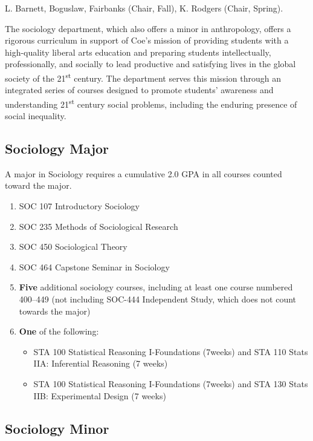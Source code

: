 \documentclass[
  letterpaper,
]{scrbook}
\providecommand{\tightlist}{%
  \setlength{\itemsep}{0pt}\setlength{\parskip}{0pt}}
\begin{document}
L. Barnett, Boguslaw, Fairbanks (Chair, Fall), K. Rodgers (Chair,
Spring).

The sociology department, which also offers a minor in anthropology,
offers a rigorous curriculum in support of Coe's mission of providing
students with a high-quality liberal arts education and preparing
students intellectually, professionally, and socially to lead productive
and satisfying lives in the global society of the 21\textsuperscript{st}
century. The department serves this mission through an integrated series
of courses designed to promote students' awareness and understanding
21\textsuperscript{st} century social problems, including the enduring
presence of social inequality.

\subsection{Sociology Major}\label{sociology-major}

A major in Sociology requires a cumulative 2.0 GPA in all courses
counted toward the major.

\begin{enumerate}
\def\labelenumi{\arabic{enumi}.}
\item
  SOC 107 Introductory Sociology
\item
  SOC 235 Methods of Sociological Research
\item
  SOC 450 Sociological Theory
\item
  SOC 464 Capstone Seminar in Sociology
\item
  \textbf{Five} additional sociology courses, including at least one
  course numbered 400--449 (not including SOC-444 Independent Study,
  which does not count towards the major)
\item
  \textbf{One} of the following:

  \begin{itemize}
  \tightlist
  \item
    STA 100 Statistical Reasoning I-Foundations (7weeks) and STA 110
    Stats IIA: Inferential Reasoning (7 weeks)
  \item
    STA 100 Statistical Reasoning I-Foundations (7weeks) and STA 130
    Stats IIB: Experimental Design (7 weeks)
  \end{itemize}
\end{enumerate}

\subsection{Sociology Minor}\label{sociology-minor}
\end{document}
